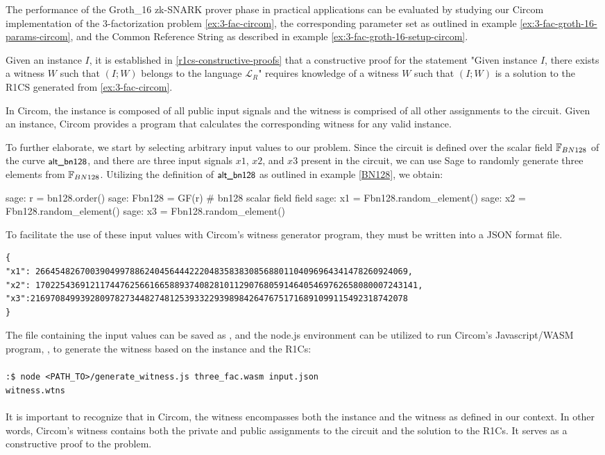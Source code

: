 \begin{example}
\label{ex:3-fac-groth-16-prover-circom} The performance of the Groth\_16 zk-SNARK prover phase in practical applications can be evaluated by studying our Circom implementation of the $3$-factorization problem \ref{ex:3-fac-circom}, the corresponding parameter set as outlined in example \ref{ex:3-fac-groth-16-params-circom}, and the Common Reference String as described in example \ref{ex:3-fac-groth-16-setup-circom}.

Given an instance $I$, it is established in \ref{r1cs-constructive-proofs} that a constructive proof for the statement "Given instance $I$, there exists a witness $W$ such that $(I;W)$ belongs to the language $\mathcal{L}_R$" requires knowledge of a witness $W$ such that $(I;W)$ is a solution to the R1CS generated from \ref{ex:3-fac-circom}.

In Circom, the instance is composed of all public input signals and the witness is comprised of all other assignments to the circuit. Given an instance, Circom provides a program that calculates the corresponding witness for any valid instance.

To further elaborate, we start by selecting arbitrary input values to our problem. Since the circuit is defined over the scalar field $\mathbb{F}_{BN128}$ of the curve $\textsf{\small alt\_bn128}$, and there are three input signals $x1$, $x2$, and $x3$ present in the circuit, we can use Sage to randomly generate three elements from $\mathbb{F}_{BN128}$. Utilizing the definition of $\textsf{\small alt\_bn128}$ as outlined in example \ref{BN128}, we obtain:
\begin{sagecommandline}
sage: r = bn128.order() 
sage: Fbn128 = GF(r) # bn128 scalar field field
sage: x1 = Fbn128.random_element()
sage: x2 = Fbn128.random_element()
sage: x3 = Fbn128.random_element()
\end{sagecommandline} 
To facilitate the use of these input values with Circom's witness generator program, they must be written into a JSON format file.
\begin{lstlisting}
{
"x1": 266454826700390499788624045644422204835838308568801104096964341478260924069,
"x2": 17022543691211744762566166588937408281011290768059146405469762658080007243141,
"x3":2169708499392809782734482748125393322939898426476751716891099115492318742078 
}
\end{lstlisting} 
The file containing the input values can be saved as , and the node.js environment can be utilized to run Circom's Javascript/WASM program, , to generate the witness based on the instance and the R1Cs:
\\
\\
\texttt{:\$ node <PATH\_TO>/generate\_witness.js three\_fac.wasm input.json\\ witness.wtns}
\\
\\
It is important to recognize that in Circom, the witness encompasses both the instance and the witness as defined in our context. In other words, Circom's witness contains both the private and public assignments to the circuit and the solution to the R1Cs. It serves as a constructive proof to the problem.


\end{example}
